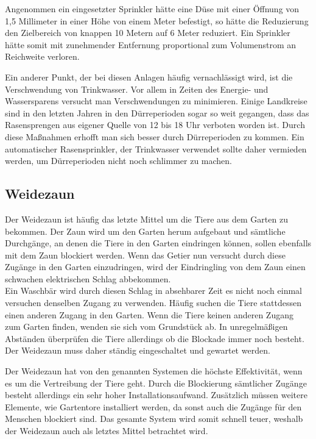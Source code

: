 Angenommen ein eingesetzter Sprinkler hätte eine Düse mit einer Öffnung von 1,5 Millimeter in einer Höhe von einem Meter befestigt, so hätte die Reduzierung den Zielbereich von knappen 10 Metern auf 6 Meter reduziert.
Ein Sprinkler hätte somit mit zunehmender Entfernung proportional zum Volumenstrom an Reichweite verloren.

Ein anderer Punkt, der bei diesen Anlagen häufig vernachlässigt wird, ist die Verschwendung von Trinkwasser. Vor allem in Zeiten des Energie- und Wassersparens versucht man Verschwendungen zu minimieren. Einige Landkreise sind in den letzten Jahren in den Dürreperioden sogar so weit gegangen, dass das Rasensprengen aus eigener Quelle von 12 bis 18 Uhr verboten worden ist. Durch diese Maßnahmen erhofft man sich besser durch Dürreperioden zu kommen. Ein automatischer Rasensprinkler, der Trinkwasser verwendet sollte daher vermieden werden, um Dürreperioden nicht noch schlimmer zu machen.\cite{wasser_verbot}

\subsection{Weidezaun}

Der Weidezaun ist häufig das letzte Mittel um die Tiere aus dem Garten zu bekommen. Der Zaun wird um den Garten herum aufgebaut und sämtliche Durchgänge, an denen die Tiere in den Garten eindringen  können, sollen ebenfalls mit dem Zaun blockiert werden. Wenn das Getier nun versucht durch diese Zugänge in den Garten einzudringen, wird der Eindringling von dem Zaun einen schwachen elektrischen Schlag abbekommen.
\\
Ein Waschbär wird durch diesen Schlag in absehbarer Zeit es nicht noch einmal versuchen denselben Zugang zu verwenden. Häufig suchen die Tiere stattdessen einen anderen Zugang in den Garten. Wenn die Tiere keinen anderen Zugang zum Garten finden, wenden sie sich vom Grundstück ab. In unregelmäßigen Abständen überprüfen die Tiere allerdings ob die Blockade immer noch besteht. Der Weidezaun muss daher ständig eingeschaltet und gewartet werden.\cite{anti_wasch}

Der Weidezaun hat von den genannten Systemen die höchste Effektivität, wenn es um die Vertreibung der Tiere geht. Durch die Blockierung sämtlicher Zugänge besteht allerdings ein sehr hoher Installationsaufwand. Zusätzlich müssen weitere Elemente, wie Gartentore installiert werden, da sonst auch die Zugänge für den Menschen blockiert sind. Das gesamte System wird somit schnell teuer, weshalb der Weidezaun auch als letztes Mittel betrachtet wird.


